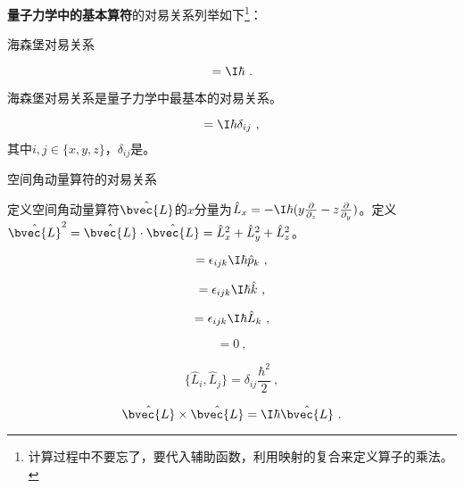 \textbf{量子力学中的基本算符}的对易关系列举如下\footnote{计算过程中不要忘了，要代入辅助函数，利用映射的复合来定义算子的乘法。}：

\begin{theorem}{海森堡对易关系}\label{the_ComOpQ_5}

\begin{equation}
[\hat{x}, \hat{p}_x] = \I\hbar~.
\end{equation}

\end{theorem}



海森堡对易关系是量子力学中最基本的对易关系。



\begin{corollary}{}\label{cor_ComOpQ_1}

\begin{equation}
[\hat{i}, \hat{p}_j]=\I\hbar\delta_{ij}~,
\end{equation}
其中$i, j\in\{x, y, z\}$，$\delta_{ij}$是。
\end{corollary}

\begin{theorem}{空间角动量算符的对易关系}\label{the_ComOpQ_6}

定义空间角动量算符$\hat{\bvec{L}}$的$x$分量为$\hat{L}_x=-\I\hbar(y\frac{\partial}{\partial_z}-z\frac{\partial}{\partial _y})$。定义$\hat{\bvec{L}}^2=\hat{\bvec{L}}\cdot \hat{\bvec{L}}=\hat{L}_x^2+\hat{L}_y^2+\hat{L}_z^2$。


\begin{equation}
[\hat{p}_i, \hat{L}_j]=\epsilon_{ijk}\I\hbar\hat{p}_k~,
\end{equation}


\begin{equation}
[\hat{i}, \hat{L}_j]=\epsilon_{ijk}\I\hbar\hat{k}~,
\end{equation}



\begin{equation}
[\hat{L}_i, \hat{L}_j]=\epsilon_{ijk}\I\hbar\hat{L}_k~,
\end{equation}

\begin{equation}
[\hat{\bvec{L}}^2, \hat{L}_i]=0~,
\end{equation}

\begin{equation}
\{\hat{L}_i, \hat{L}_j\}=\delta_{ij}\frac{\hbar^2}{2}~,
\end{equation}

\begin{equation}
\hat{\bvec{L}}\times\hat{\bvec{L}}=\I\hbar \hat{\bvec{L}}~.
\end{equation}

\end{theorem}





